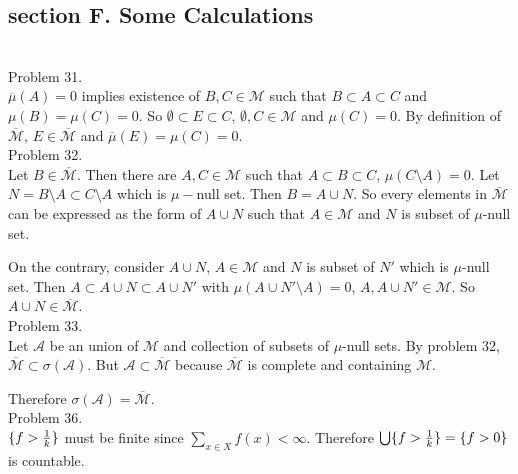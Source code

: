 \subsection*{section F. Some Calculations} \hfill \\

Problem 31. \\

$\overline{\mu}\left( A \right) = 0$ implies existence of $B, C \in \mathcal{M}$ such that $B \subset A \subset C$ and $\mu\left( B \right) = \mu\left( C \right) = 0$.
So $\emptyset \subset E \subset C$, $\emptyset, C \in \mathcal{M}$ and $\mu\left( C \right) = 0$. By definition of $\overline{\mathcal{M}}$, $E \in \overline{\mathcal{M}}$ and $\overline{\mu}\left( E \right) = \mu\left( C \right) = 0$.\\

Problem 32. \\

Let $B \in \overline{\mathcal{M}}$. Then there are $A, C \in \mathcal{M}$ such that $A\subset B \subset C$, $\mu\left( C \setminus A \right) = 0$. Let $N = B \setminus A \subset C\setminus A$ which is $\mu -$null set. Then $B = A \cup N$. So every elements in $\overline{\mathcal{M}}$ can be expressed as the form of $A \cup N$ such that $A\in \mathcal{M}$ and $N$ is subset of $\mu$-null set.

On the contrary, consider $A\cup N$, $A\in \mathcal{M}$ and $N$ is subset of $N'$ which is $\mu$-null set.
Then $A \subset A\cup N \subset A \cup N'$ with $\mu\left( A\cup N' \setminus A \right) = 0$, $A, A\cup N' \in \mathcal{M}$. So $A\cup N \in \overline{\mathcal{M}}$. \\

Problem 33. \\

Let $\mathcal{A}$ be an union of $\mathcal{M}$ and collection of subsets of $\mu$-null sets. By problem 32, $\overline{\mathcal{M}} \subset \sigma\left( \mathcal{A} \right) $.
But $\mathcal{A} \subset \overline{\mathcal{M}}$ because $\overline{\mathcal{M}}$ is complete and containing $\mathcal{M}$.

Therefore $\sigma\left( \mathcal{A} \right) = \overline{\mathcal{M}}$. \\

Problem 36. \\

$\{ f > {1 \over k} \}$ must be finite since $\sum_{x\in X}f(x) < \infty$. Therefore $\bigcup \{ f > {1 \over k} \} = \{ f > 0 \}  $ is countable. \\

